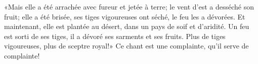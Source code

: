 «Mais elle a été arrachée avec fureur et jetée à terre;
	le vent d’est a desséché son fruit;
	elle a été brisée, ses tiges vigoureuses ont séché, le feu les a dévorées.
Et maintenant, elle est plantée au désert, dans un pays de soif et d’aridité.
	Un feu est sorti de ses tiges, il a dévoré ses sarments et ses fruits.
	Plus de tiges vigoureuses, plus de sceptre royal!»
Ce chant est une complainte, qu’il serve de complainte!

